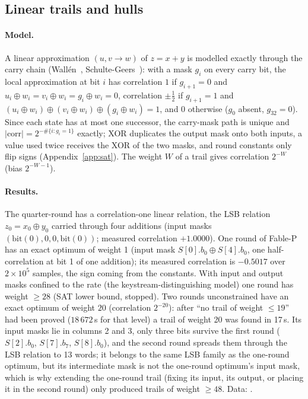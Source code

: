 \documentclass{iacrtrans}
\newcommand{\FableP}{\textsf{Fable-P}\xspace}
\newcommand{\WlinTwo}{20}    %
\begin{document}
\subsection{Linear trails and hulls}
\label{sec:linear}
\paragraph{Model.} A linear approximation $(u,v\to w)$ of $z = x+y$ is modelled exactly through the carry chain (Wall\'en~\cite{Wallen03}, Schulte-Geers~\cite{SchulteGeers13}): with a mask $g_i$ on every carry bit, the local approximation at bit $i$ has correlation $1$ if $g_{i+1} = 0$ and $u_i\oplus w_i = v_i\oplus w_i = g_i\oplus w_i = 0$, correlation $\pm\tfrac12$ if $g_{i+1} = 1$ and $(u_i\oplus w_i)\oplus(v_i\oplus w_i)\oplus(g_i\oplus w_i) = 1$, and $0$ otherwise ($g_0$ absent, $g_{32} = 0$). Since each state has at most one successor, the carry-mask path is unique and $|\mathrm{corr}| = 2^{-\#\{i: g_i = 1\}}$ exactly; XOR duplicates the output mask onto both inputs, a value used twice receives the XOR of the two masks, and round constants only flip signs (Appendix~\ref{app:sat}). The weight $W$ of a trail gives correlation $2^{-W}$ (bias $2^{-W-1}$).

\paragraph{Results.} The quarter-round has a correlation-one linear relation, the LSB relation $z_0 = x_0\oplus y_0$ carried through four additions (input masks $(\mathrm{bit}(0),0,0,\mathrm{bit}(0))$; measured correlation $+1.0000$). One round of \FableP has an exact optimum of weight 1 (input mask $S[0].b_0 \oplus S[4].b_0$, one half-correlation at bit 1 of one addition); its measured correlation is $-0.5017$ over $2\times10^5$ samples, the sign coming from the constants. With input and output masks confined to the rate (the keystream-distinguishing model) one round has weight $\geq 28$ (SAT lower bound, stopped). Two rounds unconstrained have an exact optimum of weight $\WlinTwo$ (correlation $2^{-\WlinTwo}$): after ``no trail of weight $\leq 19$'' had been proved ($18\,672$\,s for that level) a trail of weight 20 was found in 17\,s. Its input masks lie in columns 2 and 3, only three bits survive the first round ($S[2].b_0$, $S[7].b_7$, $S[8].b_0$), and the second round spreads them through the LSB relation to 13 words; it belongs to the same LSB family as the one-round optimum, but its intermediate mask is not the one-round optimum's input mask, which is why extending the one-round trail (fixing its input, its output, or placing it in the second round) only produced trails of weight $\geq 48$. Data: .
\end{document}
